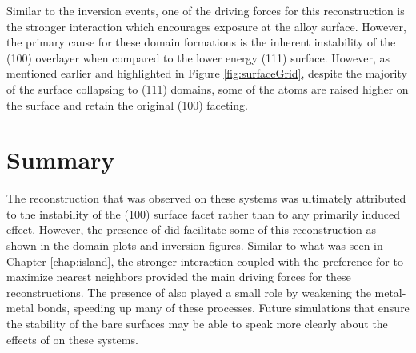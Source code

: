 Similar to the inversion events, one of the driving forces for this
reconstruction is the stronger  interaction which encourages
 exposure at the alloy surface. However, the primary cause for these
domain formations is the inherent instability of the (100) overlayer when
compared to the lower energy (111) surface. However, as mentioned earlier and
highlighted in Figure \ref{fig:surfaceGrid}, despite the majority of the
surface  collapsing to (111) domains, some of the  atoms are
raised higher on the surface and retain the original (100) faceting.


\section{Summary}
The reconstruction that was observed on these systems was ultimately attributed
to the instability of the (100) surface facet rather than to any primarily
 induced effect. However, the presence of  did facilitate some of
this reconstruction as shown in the domain plots and inversion figures. Similar
to what was seen in Chapter \ref{chap:island}, the stronger 
interaction coupled with the preference for  to maximize nearest
neighbors provided the main driving forces for these reconstructions. The
presence of  also played a small role by weakening the metal-metal
bonds, speeding up many of these processes. Future simulations that ensure the
stability of the bare surfaces may be able to speak more clearly about the
effects of  on these systems.

